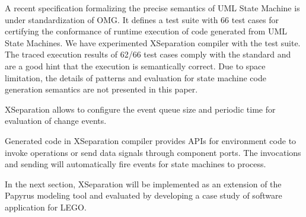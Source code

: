 \vskip 0.1cm
\noindent	
{} A recent specification formalizing the precise semantics of UML State Machine is under standardization of OMG.
It defines a test suite with 66 test cases for certifying the conformance of runtime execution of code generated from UML State Machines.
We have experimented XSeparation compiler with the test suite.
The traced execution results of 62/66 test cases comply with the standard and are a good hint that the execution is semantically correct.
Due to space limitation, the details of patterns and evaluation for state machine code generation semantics are not presented in this paper.

\vskip 0.1cm
\noindent	
{} XSeparation allows to configure the event queue size and periodic time for evaluation of change events.

\vskip 0.1cm
\noindent	
{} Generated code in XSeparation compiler provides APIs for environment code to invoke operations or send data signals through component ports.
	The invocations and sending will automatically fire events for state machines to process.


In the next section, XSeparation will be implemented as an extension of the Papyrus modeling tool and evaluated by developing a case study of software application for LEGO.